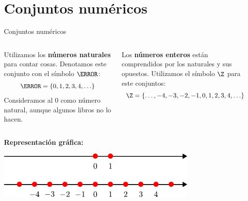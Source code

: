 \documentclass[9pt, aspectratio=169]{beamer}
\begin{document}
\section{Conjuntos numéricos}

\begin{frame}{Conjuntos numéricos}
\begin{columns}[t]
\cx
\begin{definition}
Utilizamos los \textbf{números naturales} para contar cosas. Denotamos este conjunto con el símbolo $\N$:
\[ \N = \{0, 1, 2, 3, 4, \ldots \} \]
Consideramos al $0$ como número natural, aunque algunos libros no lo hacen.
\end{definition}
\cx
\begin{definition}
Los \textbf{números enteros} están comprendidos por los naturales y sus opuestos. Utilizamos el símbolo $\Z$ para este conjuntos:
\[ \Z = \{\ldots, -4, -3, -2, -1, 0, 1, 2, 3, 4, \ldots \} \]
\end{definition}
\end{columns}

\textbf{Representación gráfica:}
\begin{center}
    \includegraphics[width=0.75\textwidth]{figs/fig-12.pdf}
\end{center}
\end{frame}
\end{document}
